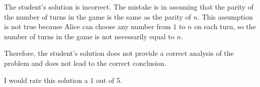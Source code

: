 The student's solution is incorrect. The mistake is in assuming that the parity of the number of turns in the game is the same as the parity of $n$. This assumption is not true because Alice can choose any number from $1$ to $n$ on each turn, so the number of turns in the game is not necessarily equal to $n$. 

Therefore, the student's solution does not provide a correct analysis of the problem and does not lead to the correct conclusion. 

I would rate this solution a 1 out of 5.
